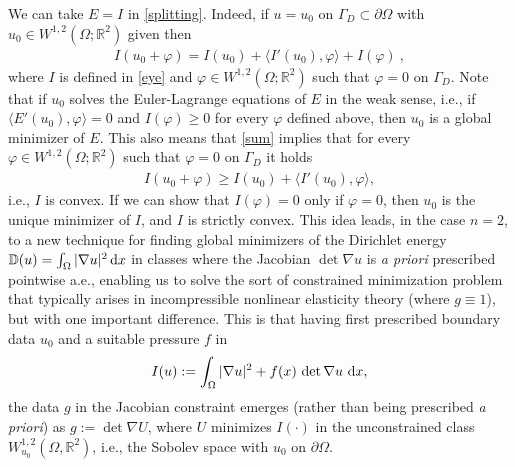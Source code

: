\documentclass[12pt]{amsart}
\newcommand{\md}{{\rm d}}
\newcommand{\dx}{\, \md x}
\newcommand{\R}{\mathbb{R}}
\newcommand{\om}{\Omega}
\newcommand{\1}{{\bf 1}}
\newcommand{\D}{\mathbb{D}}
\begin{document}
 We can take $E=I$ in \eqref{splitting}.  Indeed, if 
 $u=u_0$ on $\Gamma_D\subset \partial \om$ with $u_0\in W^{1,2}(\om; \R^2)$ given then 
 \begin{align}\label{sum}
I(u_0+\varphi)= I(u_0) + \langle I'(u_0),\varphi\rangle +I(\varphi)\ , 
\end{align}
where $I$ is defined in \eqref{eye} and $\varphi\in W^{1,2}(\om;\R^2)$ such that $\varphi=0$ on $\Gamma_D$.  Note that if $u_0$ solves the Euler-Lagrange equations  of  $E$ in the weak sense, i.e., if $\langle E'(u_0),\varphi\rangle=0$  and 
$I(\varphi)\ge 0$ for every $\varphi$ defined above, then $u_0$ is a global  minimizer of $E$. 
This also means that \eqref{sum} implies that for every $\varphi\in W^{1,2}(\om;\R^2)$ such that $\varphi=0$ on $\Gamma_D$ it holds
\begin{align}
    I(u_0+\varphi)\ge I(u_0) + \langle I'(u_0),\varphi\rangle, 
\end{align}
i.e., $I$ is convex.
If we can show that $I(\varphi)=0$ only if $\varphi=0$, then $u_0$ is the unique minimizer of $I$, and $I$ is strictly convex.
This idea leads, in the case $n=2$, to a new technique for finding global minimizers of the Dirichlet energy $\D(u)=\int_{\om} |\nabla u|^2 \dx$ in classes where the Jacobian $\det \nabla u$ is \emph{a priori} prescribed pointwise a.e., enabling us to solve the sort of constrained minimization problem %
that typically arises in incompressible nonlinear elasticity theory (where $g \equiv 1$), but with one important difference.  This is that having first prescribed boundary data $u_0$ and a suitable pressure $f$ in
\begin{align}\label{itwo}I(u):=\int_{\Omega} |\nabla u|^2 + f(x) \,\det \nabla u \, \dx,\end{align}
the data $g$ in the Jacobian constraint emerges (rather than being prescribed \emph{a priori}) as $g:=\det \nabla U$, where $U$ minimizes $I(\cdot)$ in the unconstrained class $W^{1,2}_{u_{0}}(\om,\R^2)$, i.e., the Sobolev space with $u_0$ on $\partial\om$. 
\end{document}
